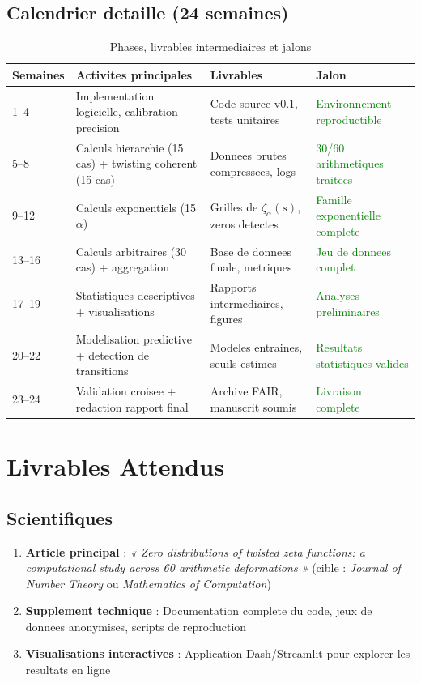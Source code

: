 \documentclass[11pt,a4paper]{article}
\begin{document}
	\subsection{Calendrier detaille (24 semaines)}
	\begin{table}[ht]
		\centering
		\caption{Phases, livrables intermediaires et jalons}
		\label{tab:timeline}
		\begin{tabular}{p{2cm}p{4cm}p{4cm}p{3cm}}
			\toprule
			\textbf{Semaines} & \textbf{Activites principales} & \textbf{Livrables} & \textbf{Jalon} \\
			\midrule
			1--4 & Implementation logicielle, calibration precision & Code source v0.1, tests unitaires & \textcolor{green}{Environnement reproductible} \\
			5--8 & Calculs hierarchie (15 cas) + twisting coherent (15 cas) & Donnees brutes compressees, logs & \textcolor{green}{30/60 arithmetiques traitees} \\
			9--12 & Calculs exponentiels (15 $\alpha$) & Grilles de $\zeta_\alpha(s)$, zeros detectes & \textcolor{green}{Famille exponentielle complete} \\
			13--16 & Calculs arbitraires (30 cas) + aggregation & Base de donnees finale, metriques & \textcolor{green}{Jeu de donnees complet} \\
			17--19 & Statistiques descriptives + visualisations & Rapports intermediaires, figures & \textcolor{green}{Analyses preliminaires} \\
			20--22 & Modelisation predictive + detection de transitions & Modeles entraines, seuils estimes & \textcolor{green}{Resultats statistiques valides} \\
			23--24 & Validation croisee + redaction rapport final & Archive FAIR, manuscrit soumis & \textcolor{green}{Livraison complete} \\
			\bottomrule
		\end{tabular}
	\end{table}
	
	\section{Livrables Attendus}
	\label{sec:livrables}
	
	\subsection{Scientifiques}
	\begin{enumerate}
		\item \textbf{Article principal} : \textit{« Zero distributions of twisted zeta functions: a computational study across 60 arithmetic deformations »} (cible : \textit{Journal of Number Theory} ou \textit{Mathematics of Computation})
		\item \textbf{Supplement technique} : Documentation complete du code, jeux de donnees anonymises, scripts de reproduction
		\item \textbf{Visualisations interactives} : Application Dash/Streamlit pour explorer les resultats en ligne
	\end{enumerate}
	
\end{document}
